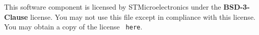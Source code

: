 This software component is licensed by STMicroelectronics under the {\bfseries{BSD-\/3-\/\+Clause}} license. You may not use this file except in compliance with this license. You may obtain a copy of the license {\texttt{ here}}. 